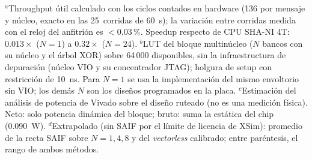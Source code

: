 \begin{table}[htbp]
  \caption{Escalado multinúcleo del acelerador SHA-256 en FPGA (SP701, xc7s100fgga676-2, 100~MHz, $C=64$~B)}
  \label{tab:fpga}
  \centering
  \setlength{\tabcolsep}{3pt}
  \par\vspace{2pt}
  \begin{minipage}{\columnwidth}\footnotesize\raggedright
  $^a$Throughput útil calculado con los ciclos contados en hardware (136 por mensaje y núcleo, exacto en las 25~corridas de 60~s); la variación entre corridas medida con el reloj del anfitrión es $<0.03$\,\%. Speedup respecto de CPU SHA-NI 4T: $0.013\times$ ($N=1$) a $0.32\times$ ($N=24$).
  $^b$LUT del bloque multinúcleo ($N$ bancos con su núcleo y el árbol XOR) sobre 64\,000 disponibles, sin la infraestructura de depuración (núcleo VIO y su concentrador JTAG); holgura de setup con restricción de 10~ns. Para $N=1$ se usa la implementación del mismo envoltorio sin VIO; los demás $N$ son los diseños programados en la placa.
  $^c$Estimación del análisis de potencia de Vivado sobre el diseño ruteado (no es una medición física). Neto: solo potencia dinámica del bloque; bruto: suma la estática del chip (0.090~W). $^{d}$Extrapolado (sin SAIF por el límite de licencia de XSim): promedio de la recta SAIF sobre $N=1,4,8$ y del \textit{vectorless} calibrado; entre paréntesis, el rango de ambos métodos.
  \end{minipage}
\end{table}
